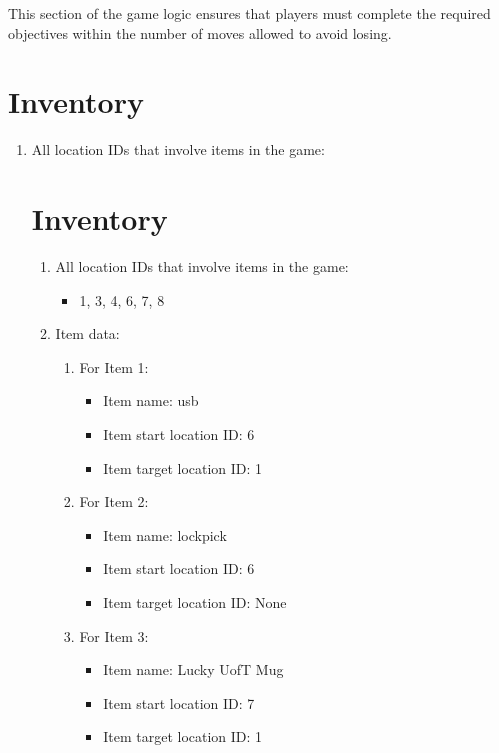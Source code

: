 \documentclass[11pt]{article}
\begin{document}
This section of the game logic ensures that players must complete the required objectives within the number of moves
allowed to avoid losing.

\section*{Inventory}

\begin{enumerate}
\item All location IDs that involve items in the game:

\section*{Inventory}

\begin{enumerate}
    \item All location IDs that involve items in the game:
    \begin{itemize}
        \item 1, 3, 4, 6, 7, 8
    \end{itemize}

    \item Item data:
    \begin{enumerate}
        \item For Item 1:
        \begin{itemize}
            \item Item name: usb
            \item Item start location ID: 6
            \item Item target location ID: 1
        \end{itemize}

        \item For Item 2:
        \begin{itemize}
            \item Item name: lockpick
            \item Item start location ID: 6
            \item Item target location ID: None
        \end{itemize}

        \item For Item 3:
        \begin{itemize}
            \item Item name: Lucky UofT Mug
            \item Item start location ID: 7
            \item Item target location ID: 1
        \end{itemize}


\end{enumerate}
\end{enumerate}
\end{enumerate}
\end{document}
